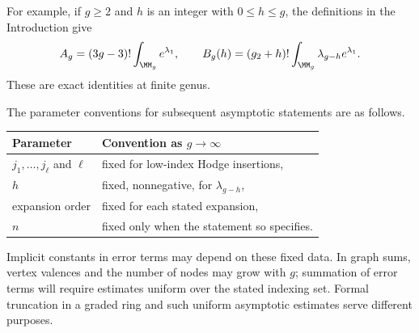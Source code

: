 For example, if $g\geq2$ and $h$ is an integer with $0\leq h\leq g$,
the definitions in the Introduction give
\begin{equation}
\label{eq:s02:hodge-factorials}
A_g=(3g-3)!\int_{\MM_g}e^{\lambda_1},
\qquad
B_g(h)=(g_2+h)!\int_{\MM_g}\lambda_{g-h}e^{\lambda_1}.
\end{equation}
These are exact identities at finite genus.

The parameter conventions for subsequent asymptotic statements are as
follows.
\begin{center}
\begin{tabular}{ll}
Parameter & Convention as $g\to\infty$ \\
\hline
$j_1,\ldots,j_\ell$ and $\ell$ & fixed for low-index Hodge insertions, \\
$h$ & fixed, nonnegative, for $\lambda_{g-h}$, \\
expansion order & fixed for each stated expansion, \\
$n$ & fixed only when the statement so specifies.
\end{tabular}
\end{center}
Implicit constants in error terms may depend on these fixed data.
In graph sums, vertex valences and the number of nodes may grow with
$g$; summation of error terms will require estimates uniform over the
stated indexing set.  Formal truncation in a graded ring and such
uniform asymptotic estimates serve different purposes.
